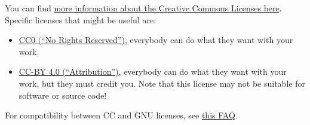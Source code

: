 \documentclass[
]{book}
\providecommand{\tightlist}{%
  \setlength{\itemsep}{0pt}\setlength{\parskip}{0pt}}
\begin{document}
You can find \href{https://creativecommons.org/share-your-work/licensing-examples}{more information about the Creative Commons Licenses here}. Specific licenses that might be useful are:

\begin{itemize}
\tightlist
\item
  \href{https://creativecommons.org/share-your-work/public-domain/cc0/}{CC0 (``No Rights Reserved'')}, everybody can do what they want with your work.
\item
  \href{https://creativecommons.org/licenses/by/4.0/}{CC-BY 4.0 (``Attribution'')}, everybody can do what they want with your work, but they must credit you. Note that this license may not be suitable for software or source code!
\end{itemize}

For compatibility between CC and GNU licenses, see \href{https://creativecommons.org/faq/\#Can_I_apply_a_Creative_Commons_license_to_software.3F}{this FAQ}.

  
\end{document}
